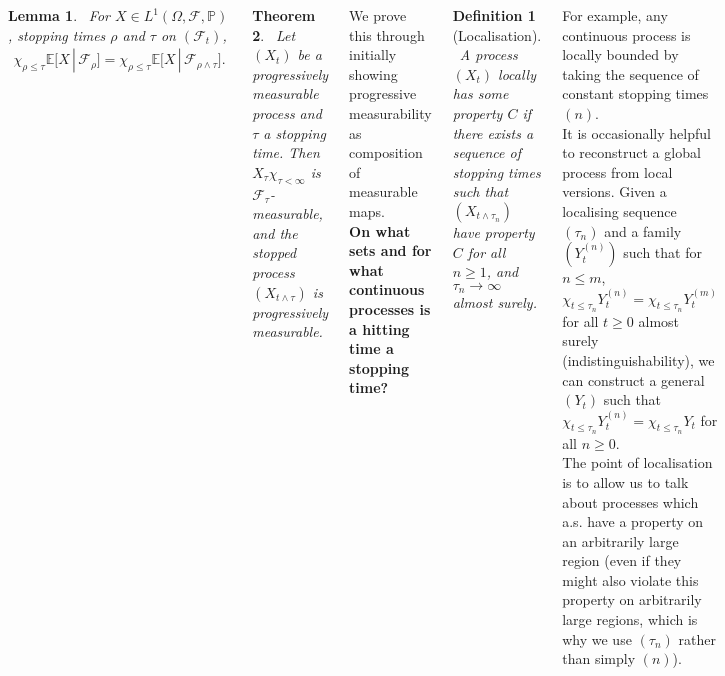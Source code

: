 \documentclass{tikzposter} %
\newtheorem{theorem}{Theorem}
\newtheorem{lemma}[theorem]{Lemma}
\newtheorem{definition}{Definition}
\begin{document}
\begin{columns}
{{      \begin{lemma}
      \ For $X \in L^{1}(\Omega, \mathcal{F}, \mathbb{P})$, stopping times $\rho$ and $\tau$ on $(\mathcal{F}_{t})$,
      \begin{align*}
        \chi_{\rho \le \tau} \mathbb{E}\big[X \,|\, \mathcal{F}_{\rho}\big] = \chi_{\rho \le \tau} \mathbb{E}\big[X \,|\, \mathcal{F}_{\rho \land \tau}\big].
      \end{align*}
      \end{lemma}

      \begin{theorem}
      \ Let $(X_{t})$ be a progressively measurable process and $\tau$ a stopping time. Then $X_{\tau} \chi_{\tau < \infty}$ is $\mathcal{F}_{\tau}$-measurable, and the stopped process $(X_{t \land \tau})$ is progressively measurable.
      \end{theorem}
      \hphantom{}

      We prove this through initially showing progressive measurability as composition of measurable maps. \\

      \textbf{On what sets and for what continuous processes is a hitting time a stopping time?} \\

      \begin{definition}[Localisation]
      \ A process $(X_{t})$ locally has some property $C$ if there exists a sequence of stopping times such that $(X_{t \land \tau_{n}})$ have property $C$ for all $n \ge 1$, and $\tau_{n} \to \infty$ almost surely.
      \end{definition}
      \hphantom{}

      For example, any continuous process is locally bounded by taking the sequence of constant stopping times $(n)$. \\

      It is occasionally helpful to reconstruct a global process from local versions. Given a localising sequence $(\tau_{n})$ and a family $(Y^{(n)}_{t})$ such that for $n \le m$, $\chi_{t \le \tau_{n}}Y^{(n)}_{t} = \chi_{t \le \tau_{n}} Y^{(m)}_{t}$ for all $t \ge 0$ almost surely (indistinguishability), we can construct a general $(Y_{t})$ such that $\chi_{t \le \tau_{n}}Y^{(n)}_{t} = \chi_{t \le \tau_{n}} Y_{t}$ for all $n \ge 0$. \\

      The point of localisation is to allow us to talk about processes which a.s. have a property on an arbitrarily large region (even if they might also violate this property on arbitrarily large regions, which is why we use $(\tau_{n})$ rather than simply $(n)$).
    }
  }
\end{columns}
\end{document}
